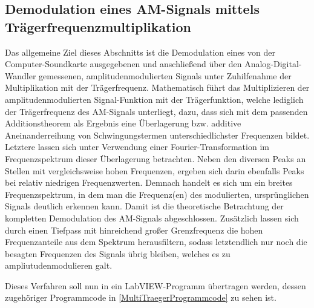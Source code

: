 \documentclass[
a4paper,
12pt,
pagesize,
ngerman
]{scrartcl}
\begin{document}
	\subsection{Demodulation eines AM-Signals mittels Trägerfrequenzmultiplikation} \label{DemodTraeger}
	
	Das allgemeine Ziel dieses Abschnitts ist die Demodulation eines von der Computer-Soundkarte ausgegebenen und anschließend über den Analog-Digital-Wandler gemessenen, amplitudenmodulierten Signals unter Zuhilfenahme der Multiplikation mit der Trägerfrequenz.
	Mathematisch führt das Multiplizieren der amplitudenmodulierten Signal-Funktion mit der Trägerfunktion, welche lediglich der Trägerfrequenz des AM-Signals unterliegt, dazu, dass sich mit dem passenden Additionstheorem als Ergebnis eine Überlagerung bzw. additive Aneinanderreihung von Schwingungstermen unterschiedlichster Frequenzen bildet.
	Letztere lassen sich unter Verwendung einer Fourier-Transformation im Frequenzspektrum dieser Überlagerung betrachten.
	Neben den diversen Peaks an Stellen mit vergleichsweise hohen Frequenzen, ergeben sich darin ebenfalls Peaks bei relativ niedrigen Frequenzwerten.
	Demnach handelt es sich um ein breites Frequenzspektrum, in dem man die Frequenz(en) des modulierten, ursprünglichen Signals deutlich erkennen kann.
	Damit ist die theoretische Betrachtung der kompletten Demodulation des AM-Signals abgeschlossen.
	Zusätzlich lassen sich durch einen Tiefpass mit hinreichend großer Grenzfrequenz die hohen Frequenzanteile aus dem Spektrum herausfiltern, sodass letztendlich nur noch die besagten Frequenzen des Signals übrig bleiben, welches es zu ampliutudenmodulieren galt. 
		
	
	Dieses Verfahren soll nun in ein LabVIEW-Programm übertragen werden, dessen zugehöriger Programmcode in \cref{MultiTraegerProgrammcode} zu sehen ist. 
	
\end{document}
